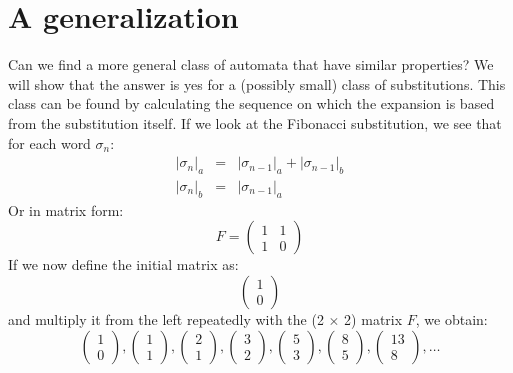 \documentclass{article}
\theoremstyle{definition}
\begin{document}
\section{A generalization}
Can we find a more general class of automata that have similar properties? We 
will show that the answer is yes for a (possibly small) class of substitutions.
This class can be found by calculating the sequence on which the expansion is 
based from the substitution itself. If we look at the Fibonacci substitution, 
we see that for each word $\sigma_n$:
\begin{eqnarray*}
|\sigma_n|_a &=& |\sigma_{n - 1}|_a + |\sigma_{n - 1}|_b\\
|\sigma_n|_b &=& |\sigma_{n - 1}|_a
\end{eqnarray*}
Or in matrix form:
\begin{displaymath} F = \left( \begin{array}{cc}
1 & 1\\
1 & 0
\end{array} \right) \end{displaymath}
If we now define the initial matrix as:
\begin{displaymath} \left( \begin{array}{c}
1 \\
0 
\end{array} \right) \end{displaymath}
and multiply it from the left repeatedly with the (2 $\times$ 2) matrix $F$, we
obtain:
\begin{displaymath} 
\left( \begin{array}{c}
1 \\
0 
\end{array} \right),
\left( \begin{array}{c}
1 \\
1 
\end{array} \right),
\left( \begin{array}{c}
2 \\
1 
\end{array} \right),
\left( \begin{array}{c}
3 \\
2 
\end{array} \right),
\left( \begin{array}{c}
5 \\
3 
\end{array} \right),
\left( \begin{array}{c}
8 \\
5 
\end{array} \right),
\left( \begin{array}{c}
13 \\
8 
\end{array} \right), \ldots
\end{displaymath}
\end{document}
